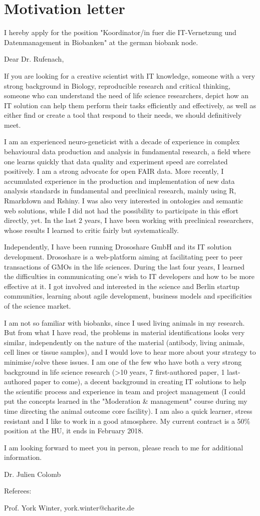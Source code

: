 \section* {Motivation letter}

I hereby apply for the position "Koordinator/in fuer die IT-Vernetzung und Datenmanagement in Biobanken" at the german biobank node.
\vspace {0.5cm} 

Dear Dr. Rufenach,

If you are looking for a creative scientist with IT knowledge, someone with a very strong background in Biology, reproducible research and critical thinking, someone who can understand the need of life science researchers, depict how an IT solution can help them perform their tasks efficiently and effectively, as well as either find or create a tool that respond to their needs, we should definitively meet.

I am an experienced neuro-geneticist with a decade of experience in complex behavioural data production and analysis in fundamental research, a field where one learns quickly that data quality and experiment speed are correlated positively. I am a strong advocate for open FAIR data.
More recently, I accumulated experience in the production and implementation of new data analysis standards in fundamental and preclinical research, mainly using R, Rmarkdown and Rshiny. I was also very interested in ontologies and semantic web solutions, while I did not had the possibility to participate in this effort directly, yet. In the last 2 years, I have been working with preclinical researchers, whose results I learned to critic fairly but systematically.

Independently, I have been running Drososhare GmbH and its IT solution development. Drososhare is a web-platform aiming at facilitating peer to peer transactions of GMOs in the life sciences. During the last four years, I learned the difficulties in communicating one's wish to IT developers and how to be more effective at it. I got involved and interested in the science and Berlin startup communities, learning about agile development, business models and specificities of the science market.

I am not so familiar with biobanks, since I used living animals in my research. But from what I have read, the problems in material identifications looks very similar, independently on the nature of the material (antibody, living animals, cell lines or tissue samples), and I would love to hear more about your strategy to minimise/solve these issues.  I am one of the few who have both a very strong background in life science research (>10 years, 7 first-authored paper, 1 last-authored paper to come), a decent background in creating IT solutions to help the scientific process and experience in team and project management (I could put the concepts learned in the "Moderation \& management" course during my time directing the animal outcome core facility). I am also a quick learner, stress resistant and I like to work in a good atmosphere. My current contract is a 50\% position at the HU, it ends in February 2018. 

I am looking forward to meet you in person,
please reach to me for additional information.

Dr. Julien Colomb


\vspace {0.5cm} 

Referees:

Prof. York Winter, york.winter@charite.de
